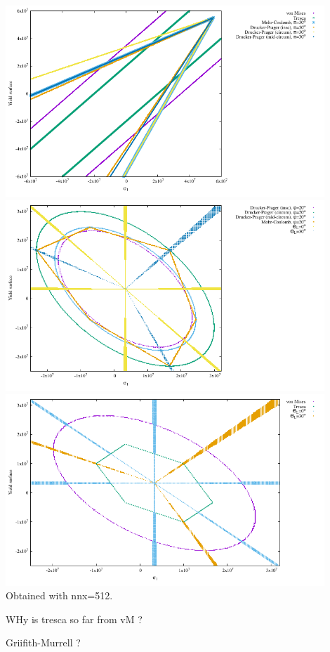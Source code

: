 \begin{center}
\includegraphics[width=12cm]{python_codes/fieldstone_159/images/surfaces_xy.pdf}
\includegraphics[width=12cm]{python_codes/fieldstone_159/images/surfaces_plane.pdf}
\includegraphics[width=12cm]{python_codes/fieldstone_159/images/surfaces_plane2.pdf}\\
{\captionfont Obtained with nnx=512}.
\end{center}

WHy is tresca so far from vM ?

Griifith-Murrell ?

